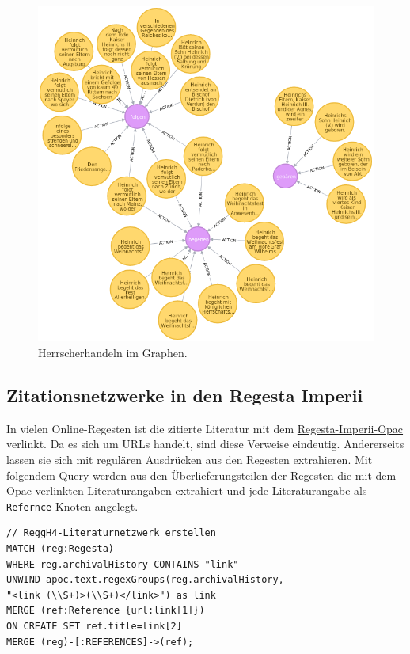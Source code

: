 \begin{figure}
\centering
\includegraphics{Bilder/RI2Graph/ReggH4-Action.png}
\caption{Herrscherhandeln im Graphen.}
\end{figure}

\hypertarget{zitationsnetzwerke-in-den-regesta-imperii}{%
\subsection{Zitationsnetzwerke in den Regesta
Imperii}\label{zitationsnetzwerke-in-den-regesta-imperii}}

In vielen Online-Regesten ist die zitierte Literatur mit dem
\href{http://opac.regesta-imperii.de/lang_de/}{Regesta-Imperii-Opac}
verlinkt. Da es sich um URLs handelt, sind diese Verweise eindeutig.
Andererseits lassen sie sich mit regulären Ausdrücken aus den Regesten
extrahieren. Mit folgendem Query werden aus den Überlieferungsteilen der
Regesten die mit dem Opac verlinkten Literaturangaben extrahiert und
jede Literaturangabe als \texttt{Refernce}-Knoten angelegt.

\begin{verbatim}
// ReggH4-Literaturnetzwerk erstellen
MATCH (reg:Regesta)
WHERE reg.archivalHistory CONTAINS "link"
UNWIND apoc.text.regexGroups(reg.archivalHistory,
"<link (\\S+)>(\\S+)</link>") as link
MERGE (ref:Reference {url:link[1]})
ON CREATE SET ref.title=link[2]
MERGE (reg)-[:REFERENCES]->(ref);
\end{verbatim}

